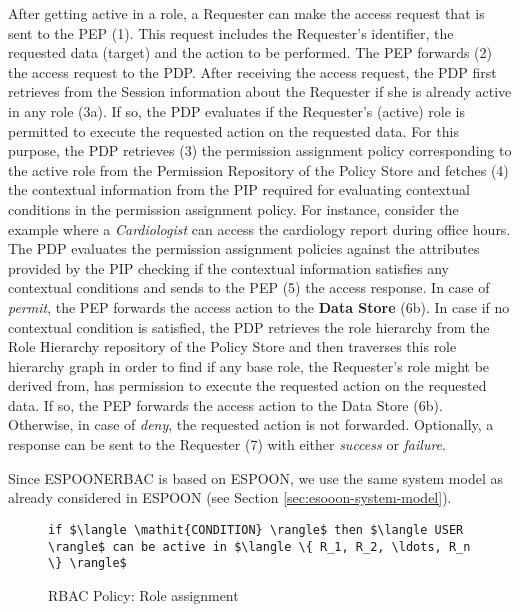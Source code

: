 \documentclass[epsfig,a4paper,11pt,titlepage]{book}
\numberwithin{algorithm}{chapter}
\newcommand{\Keywords}{\lstset{keywords={if,then,can,be,active,in,execute}}}
\begin{document}
After getting active in a role, a Requester can make the access request that is sent to the \gls{PEP} (1). This request includes the Requester's identifier, the requested data (target) and the action to be performed. The \gls{PEP} forwards (2) the access request to the \gls{PDP}. After receiving the access request, the \gls{PDP} first retrieves from the Session information about the Requester if she is already active in any role (3a). If so, the \gls{PDP} evaluates if the Requester's (active) role is permitted to execute the requested action on the requested data. For this purpose, the \gls{PDP} retrieves (3) the permission assignment policy corresponding to the active role from the Permission Repository of the Policy Store and fetches (4) the contextual information from the \gls{PIP} required for evaluating contextual conditions in the permission assignment policy. For instance, consider the example where a \emph{Cardiologist} can access the cardiology report during office hours. The \gls{PDP} evaluates the permission assignment policies against the attributes provided by the \gls{PIP} checking if the contextual information satisfies any contextual conditions and sends to the \gls{PEP} (5) the access response. In case of \emph{permit}, the \gls{PEP} forwards the access action to the \textbf{Data Store} (6b). In case if no contextual condition is satisfied, the \gls{PDP} retrieves the role hierarchy from the Role Hierarchy repository of the Policy Store and then traverses this role hierarchy graph in order to find if any base role, the Requester's role might be derived from, has permission to execute the requested action on the requested data. If so, the \gls{PEP} forwards the access action to the Data Store (6b). Otherwise, in case of \emph{deny}, the requested action is not forwarded. Optionally, a response can be sent to the Requester (7) with either \emph{success} or \emph{failure}.

Since \gls{ESPOONERBAC} is based on \gls{ESPOON}, we use the same system model as already considered in \gls{ESPOON} (see Section \ref{sec:esooon-system-model}).

\begin{figure} [htp]
\Keywords
\begin{lstlisting}[style=AMMA,numbers=none,breaklines,mathescape,rulesepcolor=\color{black}]
if $\langle \mathit{CONDITION} \rangle$ then $\langle USER \rangle$ can be active in $\langle \{ R_1, R_2, \ldots, R_n \} \rangle$

\end{lstlisting}
\caption[RBAC Policy: Role assignment]{\gls{RBAC} Policy: Role assignment}
\label{fig:erbac-policy-role-assignment}
\end{figure}
\end{document}
